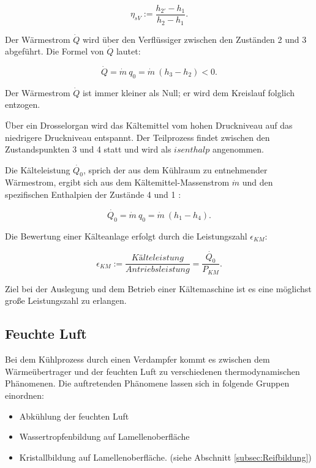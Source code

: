 \begin{equation}
\eta_{sV}:= \frac{h_{2'}- h_{1}}{h_2 - h_1}.
\label{eq:Antriebsleistung}
\end{equation}


Der Wärmestrom $\dot{Q}$ wird über den Verflüssiger zwischen den Zuständen 2 und 3 abgeführt. Die Formel von  $\dot{Q}$ lautet: 

\begin{equation}
	\dot{Q} = \dot{m}~q_0 = \dot{m}~ (h_3 - h_2)< 0.
	\label{eq:Wärmestrom}
\end{equation}

Der Wärmestrom $\dot{Q}$ ist immer kleiner als Null; er wird dem Kreislauf folglich entzogen.  
 
Über ein Drosselorgan wird das Kältemittel vom hohen Druckniveau auf das niedrigere Druckniveau entspannt. Der Teilprozess findet zwischen den Zustandspunkten 3 und 4 statt und wird als $isenthalp$ angenommen.  
 
Die Kälteleistung $\dot{Q_0}$, sprich der aus dem Kühlraum zu entnehmender Wärmestrom, ergibt sich aus dem Kältemittel-Massenstrom $\dot{m}$ und den spezifischen Enthalpien der Zustände 4 und 1 :

\begin{equation}
	\dot{Q_0} = \dot{m}~ q_0 = \dot{m}~ (h_1 - h_4).
	\label{eq:Kälteleistung}
\end{equation}




Die Bewertung einer Kälteanlage erfolgt durch die Leistungszahl $\epsilon_{KM}$: 

\begin{equation}
	\epsilon_{KM} := \frac{Kälteleistung}{Antriebsleistung} =\frac{\dot{Q_0}}{P_{KM}}.
	\label{eq:Leistungszahl}
\end{equation}

Ziel bei der Auslegung und dem Betrieb einer Kältemaschine ist es eine möglichst große Leistungszahl zu erlangen.

\subsection{Feuchte Luft}
\label{subsec:Feuchte Luft}

Bei dem Kühlprozess durch einen Verdampfer kommt es zwischen dem Wärmeübertrager und der feuchten Luft zu verschiedenen thermodynamischen Phänomenen. Die auftretenden Phänomene lassen sich in folgende Gruppen einordnen:

\begin{itemize}
\item	Abkühlung der feuchten Luft 
\item 	Wassertropfenbildung auf Lamellenoberfläche
\item	Kristallbildung auf Lamellenoberfläche. (siehe Abschnitt \ref{subsec:Reifbildung})
\end{itemize}

